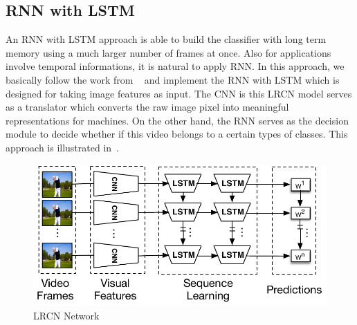 \subsection{RNN with LSTM}
An RNN with LSTM approach is able to build the classifier with long term memory using a much larger number of frames at once. 
Also for applications involve temporal informations, it is natural to apply RNN. In this approach, we basically follow the work from ~\cite{ltrcn} and implement the RNN with LSTM which is designed for taking image features as input. The CNN is this LRCN model serves as a translator which converts the raw image pixel into meaningful representations for machines. On the other hand, the RNN serves as the decision module to decide whether if this video belongs to a certain types of classes. 
This approach is illustrated in~.
\begin{figure}
  \centering
  \includegraphics[width=1.0\linewidth]{figs/lcrn}
  \caption{LRCN Network}
  \label{fig:lcrn}
\end{figure}


